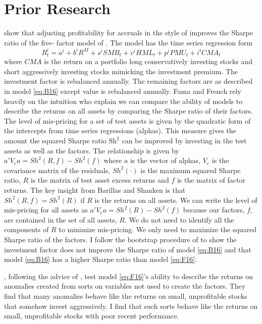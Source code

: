 
\section*{Prior Research}

\textcite{fama2016choosing} show that adjusting profitability for accruals in
the style of \textcite{ball2016accruals} improves the Sharpe ratio of the five-
factor model of \textcite{fama2015five}.
The model has the time series regression form
\begin{equation} \label{eq:F16}
R_t^i = a^i+b^iR^M+s^iSMB_t+v^iHML_t+p^iPMU_t+i^iCMA_t
\end{equation}
where $CMA$ is the return on a portfolio long conservatively investing stocks
and short aggressively investing stocks mimicking the investment premium.
The investment factor is rebalanced annually.
The remaining factors are as described in model \ref{eq:B16} except value is
rebalanced annually.
Fama and French rely heavily on the intuition \textcite{barillas2016alpha} who
explain we can compare the ability of models to describe the returns on all
assets by comparing the Sharpe ratio of their factors.
The level of mis-pricing for a set of test assets is given by the quadratic
form of the intercepts from time series regressions (alphas).
This measure gives the amount the squared Sharpe ratio $\text{Sh}^2$ can be
improved by investing in the test assets as well as the factors.
The relationship is given by $a'V_ea=Sh^2\left(R,f\right)-Sh^2\left(f\right)$
where $a$ is the vector of alphas, $V_e$ is the covariance matrix of the
residuals, $Sh^2\left(\cdot\right)$ is the maximum squared Sharpe ratio, $R$ is
the matrix of test asset excess returns and $f$ is the matrix of factor
returns.
The key insight from Barillas and Shanken is that
$Sh^2\left(R,f\right)=Sh^2\left(R\right)$ if $R$ is the returns on all assets.
We can write the level of mis-pricing for all assets as
$a'V_ea=Sh^2\left(R\right)-Sh^2\left(f\right)$ because our factors, $f$, are
contained in the set of all assets, $R$.
We do not need to identify all the components of $R$ to minimize mis-pricing.
We only need to maximize the squared Sharpe ratio of the factors.
I follow the bootstrap procedure of \textcite{fama2016choosing} to show the
investment factor does not improve the Sharpe ratio of model \ref{eq:B16} and
that model \ref{eq:B16} has a higher Sharpe ratio than model \ref{eq:F16}.

\textcite{fama2016dissecting}, following the advice of
\textcite{lewellen2010skeptical}, test model \ref{eq:F16}'s ability to describe
the returns on anomalies created from sorts on variables not used to create the
factors. They find that many anomalies
behave like the returns on small, unprofitable stocks that
somehow invest aggressively. I find that such sorts behave like the returns on
small, unprofitable stocks with poor recent performance.

